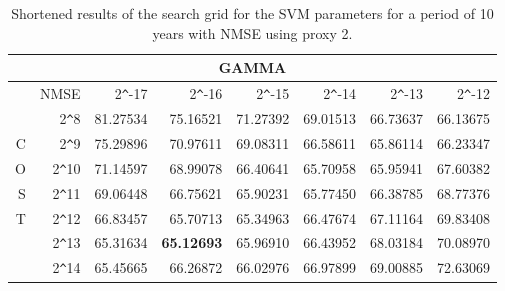 \begin{table}[h!]
\centering
\begin{adjustbox}{width=\textwidth}
\begin{tabular}{|r|r|rrrrrr|}
\hline
\multicolumn{8}{|c|}{GAMMA} \tabularnewline
   \hline
  &NMSE& 2\verb|^|-17 & 2\verb|^|-16 & 2\verb|^|-15 & 2\verb|^|-14 & 2\verb|^|-13 & 2\verb|^|-12 \\ 
  \hline
  &2\verb|^|8 & 81.27534 & 75.16521 & 71.27392 & 69.01513 & 66.73637 & 66.13675 \\ 
  C&2\verb|^|9 & 75.29896 & 70.97611 & 69.08311 & 66.58611 & 65.86114 & 66.23347 \\ 
  O&2\verb|^|10 & 71.14597 & 68.99078 & 66.40641 & 65.70958 & 65.95941 & 67.60382 \\ 
  S&2\verb|^|11 & 69.06448 & 66.75621 & 65.90231 & 65.77450 & 66.38785 & 68.77376 \\ 
  T&2\verb|^|12 & 66.83457 & 65.70713 & 65.34963 & 66.47674 & 67.11164 & 69.83408 \\ 
  &2\verb|^|13 & 65.31634 & \textbf{65.12693} & 65.96910 & 66.43952 & 68.03184 & 70.08970 \\ 
  &2\verb|^|14 & 65.45665 & 66.26872 & 66.02976 & 66.97899 & 69.00885 & 72.63069 \\ 
   \hline
\end{tabular}
\end{adjustbox}
\caption{Shortened results of the search grid for the SVM parameters for a period of 10 years with NMSE using proxy 2.}
\end{table}